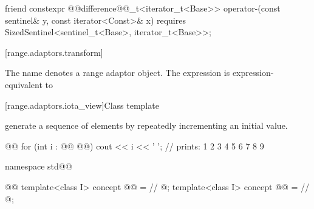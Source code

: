 {\begin{itemdescr}
\pnum
\oldtxt{\returns} 
\end{itemdescr}

%
\begin{itemdecl}
friend constexpr @@difference@@_t<iterator_t<Base>>
operator-(const sentinel& y, const iterator<Const>& x)
  requires SizedSentinel<sentinel_t<Base>, iterator_t<Base>>;
\end{itemdecl}

\begin{itemdescr}
\pnum
\oldtxt{\returns} 
\end{itemdescr}

[range.adaptors.transform]{}

\pnum
The name  denotes a range adaptor
object.  The expression   is expression-equivalent to
 


[range.adaptors.iota_view]{Class template }

\pnum
{}   generate a
sequence of elements by repeatedly incrementing an initial value.

\pnum
\begin{example}
\begin{codeblock}
@@
for (int i : @@ @@)
  cout << i << ' '; // prints: 1 2 3 4 5 6 7 8 9
\end{codeblock}
\end{example}

\begin{codeblock}
namespace std@@ { @@
  template<class I>
  concept @@ = // \expos
    @\seebelownc@;
  template<class I>
  concept @@ = // \expos
    @\seebelownc@;

}
\end{codeblock}}

